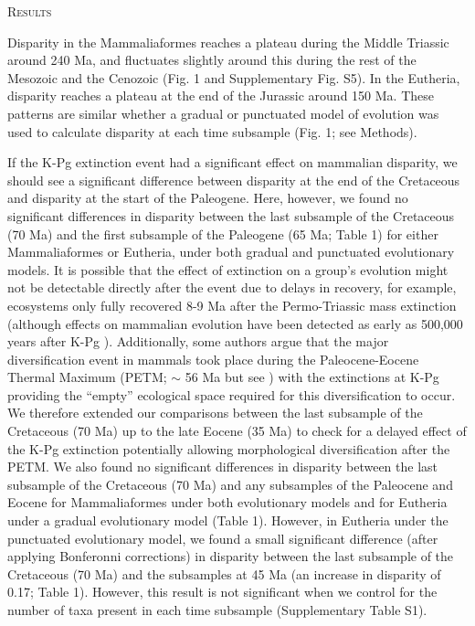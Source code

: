 \documentclass[12pt,letterpaper]{article}
\renewcommand{\section}[1]{%
\bigskip
\begin{center}
\begin{Large}
\normalfont\scshape #1
\medskip
\end{Large}
\end{center}}
\begin{document}
%
%

\section{Results}
Disparity in the Mammaliaformes reaches a plateau during the Middle Triassic around 240 Ma, and fluctuates slightly around this during the rest of the Mesozoic and the Cenozoic (Fig. 1 and Supplementary Fig. S5).
In the Eutheria, disparity reaches a plateau at the end of the Jurassic around 150 Ma.
These patterns are similar whether a gradual or punctuated model of evolution was used to calculate disparity at each time subsample (Fig. 1; see Methods).

If the K-Pg extinction event had a significant effect on mammalian disparity, we should see a significant difference between disparity at the end of the Cretaceous and disparity at the start of the Paleogene.
Here, however, we found no significant differences in disparity between the last subsample of the Cretaceous (70 Ma) and the first subsample of the Paleogene (65 Ma; Table 1) for either Mammaliaformes or Eutheria, under both gradual and punctuated evolutionary models. 
It is possible that the effect of extinction on a group's evolution might not be detectable directly after the event due to delays in recovery, for example, ecosystems only fully recovered 8-9 Ma after the Permo-Triassic mass extinction \cite{chen2012timing} (although effects on mammalian evolution have been detected as early as 500,000 years after K-Pg \cite{Wilson2013}).
Additionally, some authors argue that the major diversification event in mammals took place during the Paleocene-Eocene Thermal Maximum (PETM; $\sim$ 56 Ma \cite{bininda2007delayed} but see \cite{meredithimpacts2011,Stadler12042011}) with the extinctions at K-Pg providing the ``empty'' ecological space required for this diversification to occur.
We therefore extended our comparisons between the last subsample of the Cretaceous (70 Ma) up to the late Eocene (35 Ma) to check for a delayed effect of the K-Pg extinction potentially allowing morphological diversification after the PETM. 
We also found no significant differences in disparity between the last subsample of the Cretaceous (70 Ma) and any subsamples of the Paleocene and Eocene for Mammaliaformes under both evolutionary models and for Eutheria under a gradual evolutionary model (Table 1).
However, in Eutheria under the punctuated evolutionary model, we found a small significant difference (after applying Bonferonni corrections) in disparity between the last subsample of the Cretaceous (70 Ma) and the subsamples at 45 Ma (an increase in disparity of 0.17; Table 1).
However, this result is not significant when we control for the number of taxa present in each time subsample (Supplementary Table S1). 
\end{document}
